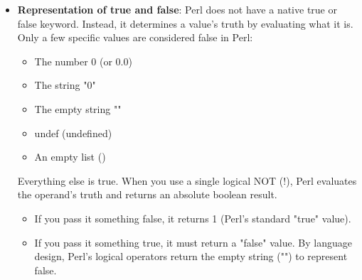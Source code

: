 \documentclass{report}
\begin{document}
    \pagebreak 
    \begin{itemize}
        \item \textbf{Representation of true and false}: 
            Perl does not have a native true or false keyword. Instead, it determines a value's truth by evaluating what it is.
            \bigbreak \noindent 
            Only a few specific values are considered false in Perl:
            \begin{itemize}
                \item The number 0 (or 0.0)
                \item The string "0"
                \item The empty string ""
                \item undef (undefined)
                \item An empty list ()
            \end{itemize}
            Everything else is true. When you use a single logical NOT (!), Perl evaluates the operand's truth and returns an absolute boolean result.
            \begin{itemize}
                \item If you pass it something false, it returns 1 (Perl's standard "true" value).
                \item If you pass it something true, it must return a "false" value. By language design, Perl's logical operators return the empty string ("") to represent false.
            \end{itemize}

    \end{itemize}

    \pagebreak 
\end{document}
